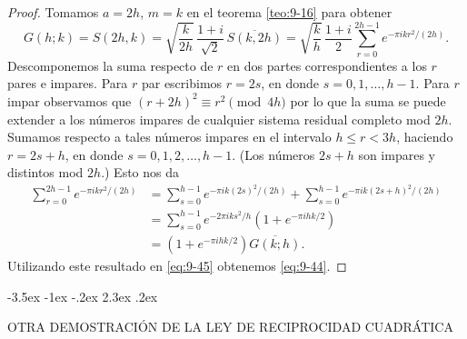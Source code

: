 \documentclass[12pt,a4paper]{book}
\makeatletter
\renewcommand\section{\@startsection{section}{1}{\z@}%
  {-3.5ex \@plus -1ex \@minus -.2ex}%
  {2.3ex \@plus .2ex}%
  {\normalfont\Large\bfseries\raggedright}}
\makeatother
\begin{document}
    \begin{proof}
        Tomamos $a=2h$, $m=k$ en el teorema \ref{teo:9-16} para obtener
        \begin{equation}\label{eq:9-45}
            G(h;k)=S(2h,k)=\sqrt{\frac{k}{2h}}\,\frac{1+i}{\sqrt{2}}\,\overline{S(k,2h)}=\sqrt{\frac{k}{h}}\,\frac{1+i}{2}\sum_{r=0}^{2h-1}e^{-\pi ikr^{2}/(2h)}.
        \end{equation}
        Descomponemos la suma respecto de $r$ en dos partes correspondientes a los $r$
        pares e impares. Para $r$ par escribimos $r=2s$, en donde $s=0,1,\dots,h-1$. Para
        $r$ impar observamos que $(r+2h)^{2}\equiv r^{2}\pmod{4h}$ por lo que la suma se puede
        extender a los números impares de cualquier sistema residual completo mod $2h$.
        Sumamos respecto a tales números impares en el intervalo $h\leq r<3h$, haciendo
        $r=2s+h$, en donde $s=0,1,2,\dots,h-1$. (Los números $2s+h$ son impares y distintos
        mod $2h$.) Esto nos da
        \begin{align*}
            \sum_{r=0}^{2h-1}e^{-\pi ikr^{2}/(2h)}&=\sum_{s=0}^{h-1}e^{-\pi ik(2s)^{2}/(2h)}+\sum_{s=0}^{h-1}e^{-\pi ik(2s+h)^{2}/(2h)}\\
            &=\sum_{s=0}^{h-1}e^{-2\pi iks^{2}/h}\left(1+e^{-\pi ihk/2}\right)\\
            &=\left(1+e^{-\pi ihk/2}\right)\overline{G(k;h)}.
        \end{align*}
        Utilizando este resultado en \eqref{eq:9-45} obtenemos \eqref{eq:9-44}.
    \end{proof}

    \section{OTRA DEMOSTRACIÓN DE LA LEY DE RECIPROCIDAD CUADRÁTICA}
\end{document}
